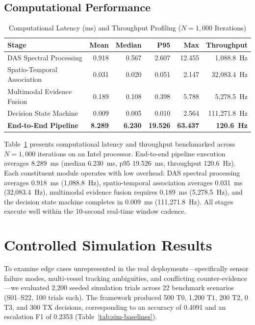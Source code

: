 \documentclass[conference]{IEEEtran}
\newcommand{\dstate}[1]{\ensuremath{\mathrm{#1}}}
\begin{document}
\subsection{Computational Performance}
\label{sec:performance}

\begin{table}[t]
\caption{Computational Latency (ms) and Throughput Profiling ($N=1{,}000$ Iterations)}
\label{tab:performance}
\centering
\setlength{\tabcolsep}{2pt}
\renewcommand{\arraystretch}{1.05}
\scriptsize
\begin{tabular}{@{}lrrrrr@{}}
\toprule
Stage & Mean & Median & P95 & Max & Throughput \\
\midrule
DAS Spectral Processing & 0.918 & 0.567 & 2.607 & 12.455 & 1{,}088.8~Hz \\
Spatio-Temporal Association & 0.031 & 0.020 & 0.051 & 2.147 & 32{,}083.4~Hz \\
Multimodal Evidence Fusion & 0.189 & 0.108 & 0.398 & 5.788 & 5{,}278.5~Hz \\
Decision State Machine & 0.009 & 0.005 & 0.010 & 2.564 & 111{,}271.8~Hz \\
\textbf{End-to-End Pipeline} & \textbf{8.289} & \textbf{6.230} & \textbf{19.526} & \textbf{63.437} & \textbf{120.6~Hz} \\
\bottomrule
\end{tabular}
\end{table}

Table~\ref{tab:performance} presents computational latency and throughput benchmarked across $N=1{,}000$ iterations on an Intel processor. End-to-end pipeline execution averages 8.289~ms (median 6.230~ms, p95 19.526~ms, throughput 120.6~Hz). Each constituent module operates with low overhead: DAS spectral processing averages 0.918~ms (1{,}088.8~Hz), spatio-temporal association averages 0.031~ms (32{,}083.4~Hz), multimodal evidence fusion requires 0.189~ms (5{,}278.5~Hz), and the decision state machine completes in 0.009~ms (111{,}271.8~Hz). All stages execute well within the 10-second real-time window cadence.

\section{Controlled Simulation Results}
\label{sec:sim}

To examine edge cases unrepresented in the real deployments---specifically sensor failure modes, multi-vessel tracking ambiguities, and conflicting counter-evidence---we evaluated 2{,}200 seeded simulation trials across 22 benchmark scenarios (S01--S22, 100 trials each). The framework produced 500 \dstate{T0}, 1{,}200 \dstate{T1}, 200 \dstate{T2}, 0 \dstate{T3}, and 300 \dstate{TX} decisions, corresponding to an accuracy of 0.4091 and an escalation F1 of 0.2353 (Table~\ref{tab:sim-baselines}).
\end{document}
